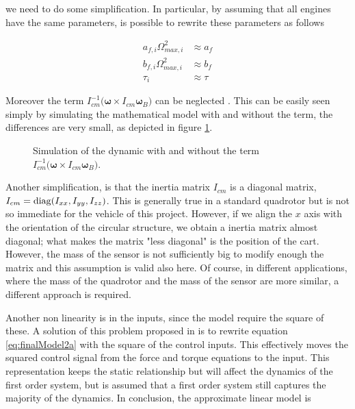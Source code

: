 \noindent we need to do some simplification. In particular, by assuming that all engines have the same parameters, is possible to rewrite these parameters as follows

\begin{align}
	a_{f,i}\Omega_{max,i}^2 &\approx a_f \\
	b_{f,i}\Omega_{max,i}^2 &\approx b_f \\
	\tau_i &\approx \tau
	\label{eq:simplification}
\end{align}

\noindent Moreover the term $I_{cm}^{-1}\bigl(\boldsymbol{\omega}\times I_{cm}\boldsymbol{\omega}_B\bigl)$ can be neglected \cite{modelIdentification}. This can be easily seen simply by simulating the mathematical model with and without the term, the differences are very small, as depicted in figure \ref{fig:comparisonOmega}. 

\begin{figure}[h]
	\centering
	
	\caption{Simulation of the dynamic with and without the term $I_{cm}^{-1}\bigl(\boldsymbol{\omega}\times I_{cm}\boldsymbol{\omega}_B\bigl)$.}
	\label{fig:comparisonOmega}
\end{figure}

\noindent Another simplification, is that the inertia matrix $I_{cm}$ is a diagonal matrix, $I_{cm} = \operatorname*{diag}(\allowbreak I_{xx}, I_{yy}, I_{zz})$. This is generally true in a standard quadrotor but is not so immediate for the vehicle of this project. However, if we align the $x$ axis with the orientation of the circular structure, we obtain a inertia matrix almost diagonal; what makes the matrix "less diagonal" is the position of the cart. However, the mass of the sensor is not sufficiently big to modify enough the matrix and this assumption is valid also here. Of course, in different applications, where the mass of the quadrotor and the mass of the sensor are more similar, a different approach is required. 

\noindent Another non linearity is in the inputs, since the model require the square of these. A solution of this problem proposed in \cite{modelIdentification} is to rewrite equation \eqref{eq:finalModel2a} with the square of the control inputs. This effectively moves the squared control signal from the force and torque equations to the input. This representation keeps the static relationship but will affect the dynamics of the first order system, but is assumed that a first order system still captures the majority of the dynamics. In conclusion, the approximate linear model is

